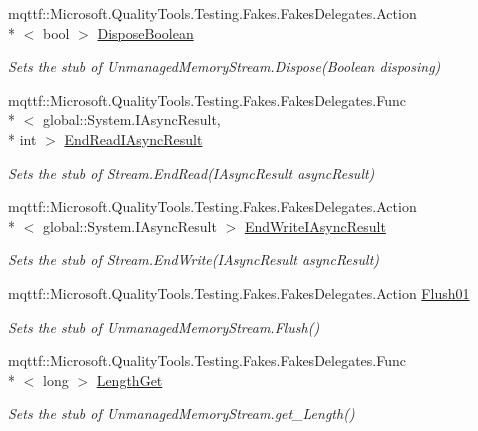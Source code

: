 \begin{DoxyCompactItemize}
mqttf\-::\-Microsoft.\-Quality\-Tools.\-Testing.\-Fakes.\-Fakes\-Delegates.\-Action\\*
$<$ bool $>$ \hyperlink{class_system_1_1_i_o_1_1_fakes_1_1_stub_unmanaged_memory_stream_a3b22fa9486b0f13f0d75120974e5a4af}{Dispose\-Boolean}
\begin{DoxyCompactList}\small\item\em Sets the stub of Unmanaged\-Memory\-Stream.\-Dispose(\-Boolean disposing)\end{DoxyCompactList}\item 
mqttf\-::\-Microsoft.\-Quality\-Tools.\-Testing.\-Fakes.\-Fakes\-Delegates.\-Func\\*
$<$ global\-::\-System.\-I\-Async\-Result, \\*
int $>$ \hyperlink{class_system_1_1_i_o_1_1_fakes_1_1_stub_unmanaged_memory_stream_a0f6fda815551c6eedd783c4bf2667028}{End\-Read\-I\-Async\-Result}
\begin{DoxyCompactList}\small\item\em Sets the stub of Stream.\-End\-Read(\-I\-Async\-Result async\-Result)\end{DoxyCompactList}\item 
mqttf\-::\-Microsoft.\-Quality\-Tools.\-Testing.\-Fakes.\-Fakes\-Delegates.\-Action\\*
$<$ global\-::\-System.\-I\-Async\-Result $>$ \hyperlink{class_system_1_1_i_o_1_1_fakes_1_1_stub_unmanaged_memory_stream_a9dd9e748c765f979179a2acf8592bb6b}{End\-Write\-I\-Async\-Result}
\begin{DoxyCompactList}\small\item\em Sets the stub of Stream.\-End\-Write(\-I\-Async\-Result async\-Result)\end{DoxyCompactList}\item 
mqttf\-::\-Microsoft.\-Quality\-Tools.\-Testing.\-Fakes.\-Fakes\-Delegates.\-Action \hyperlink{class_system_1_1_i_o_1_1_fakes_1_1_stub_unmanaged_memory_stream_af66c075ca0e942c925e197ba1550d897}{Flush01}
\begin{DoxyCompactList}\small\item\em Sets the stub of Unmanaged\-Memory\-Stream.\-Flush()\end{DoxyCompactList}\item 
mqttf\-::\-Microsoft.\-Quality\-Tools.\-Testing.\-Fakes.\-Fakes\-Delegates.\-Func\\*
$<$ long $>$ \hyperlink{class_system_1_1_i_o_1_1_fakes_1_1_stub_unmanaged_memory_stream_a71c3f5d0faf5a72dcd6192fd350b5103}{Length\-Get}
\begin{DoxyCompactList}\small\item\em Sets the stub of Unmanaged\-Memory\-Stream.\-get\-\_\-\-Length()\end{DoxyCompactList}\item 

\end{DoxyCompactItemize}
